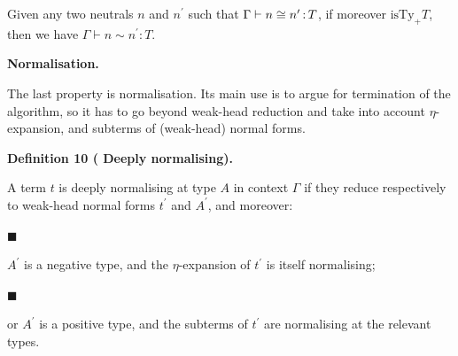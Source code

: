  
Given any two neutrals $n$ and $n^{\prime}$ such that $\Gamma\vdash n\mathrel{\raisebox{-0.5pt}{$\cong$}}n^{\prime}\operatorname{%
\mathrel{:}}T$, if moreover $\operatorname{isTy_{+}}T$, then we have $\Gamma\vdash n\sim n^{\prime}\operatorname{\mathrel{:}}T$.\par
 
 
 
 
 
\par\medskip\noindent\textbf{Normalisation.}\par
 
 
The last property is normalisation. Its main use is to argue for termination of the algorithm, so it has to go beyond weak-head reduction and take into account $\eta$-expansion, and subterms of (weak-head) normal forms.\par
 
 
 
\par\medskip\noindent\textbf{Definition 10 (  Deeply normalising).}\par
 
 
A term $t$ is deeply normalising at type $A$ in context $\Gamma$ if they reduce respectively to weak-head normal forms $t^{\prime}$ and $A^{\prime}$, and moreover:\par
  
\par\noindent  $\blacksquare$ 
 
$A^{\prime}$ is a negative type, and the $\eta$-expansion of $t^{\prime}$ is itself normalising;\par
 
 
 
\par\noindent  $\blacksquare$ 
 
or $A^{\prime}$ is a positive type, and the subterms of $t^{\prime}$ are normalising at the relevant types.\par
 
 
